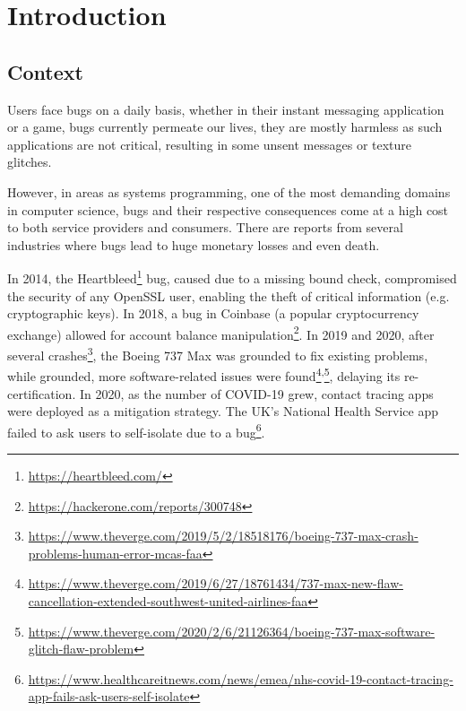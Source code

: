 \chapter{Introduction}\label{cha:introduction}

\section{Context}\label{sec:context}


Users face bugs on a daily basis, whether in their instant messaging application or a game,
bugs currently permeate our lives, they are mostly harmless as such applications are not critical,
resulting in some unsent messages or texture glitches.

However, in areas as systems programming, one of the most demanding domains in computer science,
bugs and their respective consequences come at a high cost to both service providers and consumers.
There are reports from several industries where bugs lead to huge monetary losses and even death.

In 2014, the Heartbleed\footnote{\url{https://heartbleed.com/}} bug, caused due to a missing bound check,
compromised the security of any OpenSSL user, enabling the theft of critical information (e.g. cryptographic keys).
In 2018, a bug in Coinbase (a popular cryptocurrency exchange)
allowed for account balance manipulation\footnote{\url{https://hackerone.com/reports/300748}}.
In 2019 and 2020, after several crashes\footnote{\url{https://www.theverge.com/2019/5/2/18518176/boeing-737-max-crash-problems-human-error-mcas-faa}},
the Boeing 737 Max was grounded to fix existing problems, while grounded,
more software-related issues were
found\footnote{\url{https://www.theverge.com/2019/6/27/18761434/737-max-new-flaw-cancellation-extended-southwest-united-airlines-faa}}\textsuperscript{,}\footnote{\url{https://www.theverge.com/2020/2/6/21126364/boeing-737-max-software-glitch-flaw-problem}},
delaying its re-certification.
In 2020, as the number of COVID-19 grew,
contact tracing apps were deployed as a mitigation strategy.
The UK's National Health Service app failed to ask users to self-isolate due to a
bug\footnote{\url{https://www.healthcareitnews.com/news/emea/nhs-covid-19-contact-tracing-app-fails-ask-users-self-isolate}}.

